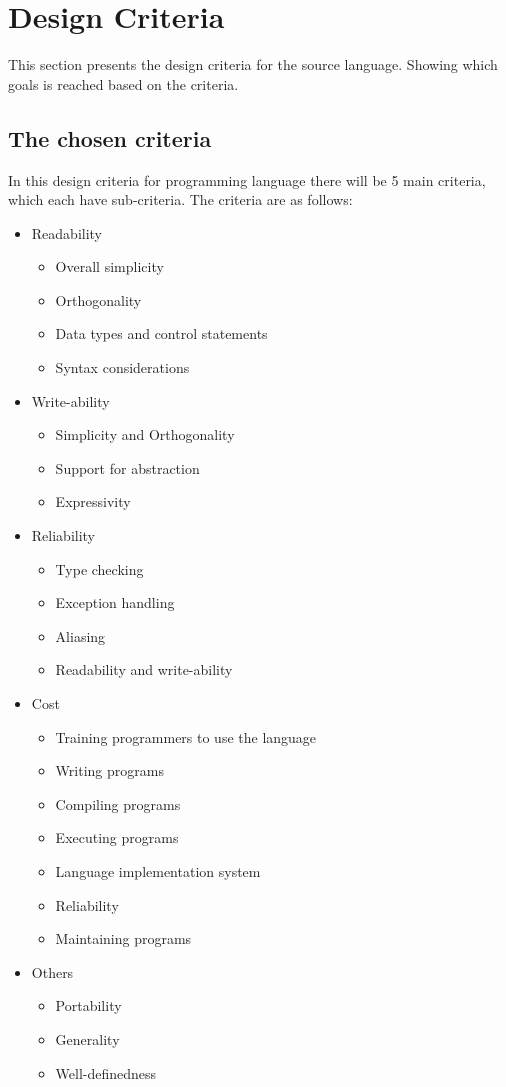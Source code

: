\chapter{Design Criteria}\label{chap:design-criteria}
This section presents the design criteria for the source language. Showing which goals is reached based on the criteria. 

\section{The chosen criteria}
In this design criteria for programming language there will be 5 main criteria, which each have sub-criteria. The criteria are as follows:
\begin{itemize}
\item Readability
\begin{itemize}
\item Overall simplicity
\item Orthogonality
\item Data types and control statements
\item Syntax considerations
\end{itemize}
\item Write-ability
\begin{itemize}
\item Simplicity and Orthogonality
\item Support for abstraction
\item Expressivity
\end{itemize}
\item Reliability
\begin{itemize}
\item Type checking
\item Exception handling
\item Aliasing
\item Readability and write-ability
\end{itemize}
\item Cost
\begin{itemize}
\item Training programmers to use the language
\item Writing programs
\item Compiling programs
\item Executing programs
\item Language implementation system
\item Reliability
\item Maintaining programs
\end{itemize}
\item Others
\begin{itemize}
\item Portability
\item Generality
\item Well-definedness
\end{itemize}
\end{itemize}


